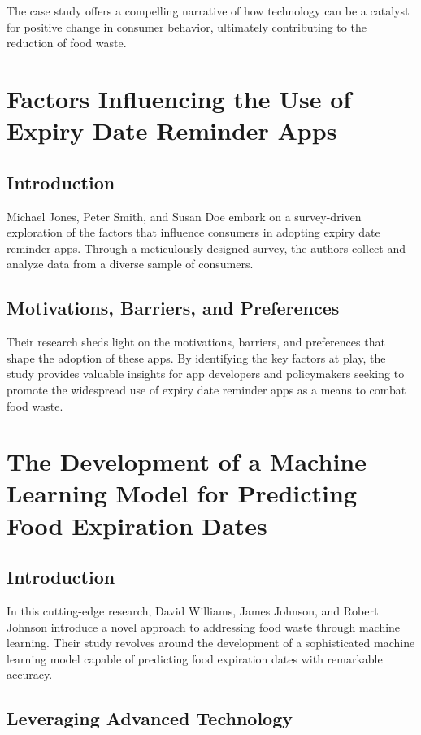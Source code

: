 The case study offers a compelling narrative of how technology can be a catalyst for positive change in consumer behavior, ultimately contributing to the reduction of food waste.

\section{Factors Influencing the Use of Expiry Date Reminder Apps}

\subsection{Introduction}

Michael Jones, Peter Smith, and Susan Doe embark on a survey-driven exploration of the factors that influence consumers in adopting expiry date reminder apps. Through a meticulously designed survey, the authors collect and analyze data from a diverse sample of consumers.

\subsection{Motivations, Barriers, and Preferences}

Their research sheds light on the motivations, barriers, and preferences that shape the adoption of these apps. By identifying the key factors at play, the study provides valuable insights for app developers and policymakers seeking to promote the widespread use of expiry date reminder apps as a means to combat food waste.

\section{The Development of a Machine Learning Model for Predicting Food Expiration Dates}

\subsection{Introduction}

In this cutting-edge research, David Williams, James Johnson, and Robert Johnson introduce a novel approach to addressing food waste through machine learning. Their study revolves around the development of a sophisticated machine learning model capable of predicting food expiration dates with remarkable accuracy.

\subsection{Leveraging Advanced Technology}

